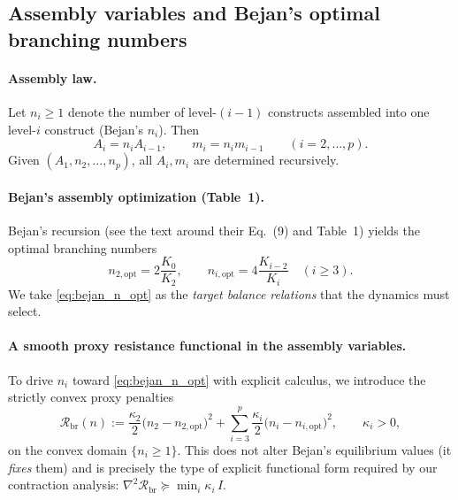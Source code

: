 \documentclass[12pt]{article}
\theoremstyle{plain}
\theoremstyle{definition}
\theoremstyle{remark}
\newcommand{\opt}{\mathrm{opt}}
\begin{document}
\subsection{Assembly variables and Bejan’s optimal branching numbers}
\label{subsec:bejan_branching_numbers}

\paragraph{Assembly law.}
Let $n_i\ge 1$ denote the number of level-$(i-1)$ constructs assembled into
one level-$i$ construct (Bejan’s $n_i$). Then
\begin{equation}
A_i = n_i A_{i-1},\qquad m_i = n_i m_{i-1} \qquad (i=2,\dots,p).
\label{eq:assembly_relations}
\end{equation}
Given $(A_1,n_2,\dots,n_p)$, all $A_i,m_i$ are determined recursively.

\paragraph{Bejan’s assembly optimization (Table~1).}
Bejan’s recursion (see the text around their Eq.~(9) and Table~1) yields the
optimal branching numbers
\begin{equation}
n_{2,\opt}=2\frac{K_0}{K_2},
\qquad
n_{i,\opt}=4\frac{K_{i-2}}{K_i}\quad (i\ge 3).
\label{eq:bejan_n_opt}
\end{equation}
We take \eqref{eq:bejan_n_opt} as the \emph{target balance relations} that
the dynamics must select.

\paragraph{A smooth proxy resistance functional in the assembly variables.}
To drive $n_i$ toward \eqref{eq:bejan_n_opt} with explicit calculus, we
introduce the strictly convex proxy penalties
\begin{equation}
\mathcal R_{\mathrm{br}}(n)
:=
\frac{\kappa_2}{2}\big(n_2-n_{2,\opt}\big)^2
+
\sum_{i=3}^p \frac{\kappa_i}{2}\big(n_i-n_{i,\opt}\big)^2,
\qquad \kappa_i>0,
\label{eq:R_branching_quadratic}
\end{equation}
on the convex domain $\{n_i\ge 1\}$.
This does not alter Bejan’s equilibrium values (it \emph{fixes} them) and is
precisely the type of explicit functional form required by our contraction
analysis: $\nabla^2 \mathcal R_{\mathrm{br}} \succeq \min_i\kappa_i\,I$.
\end{document}
